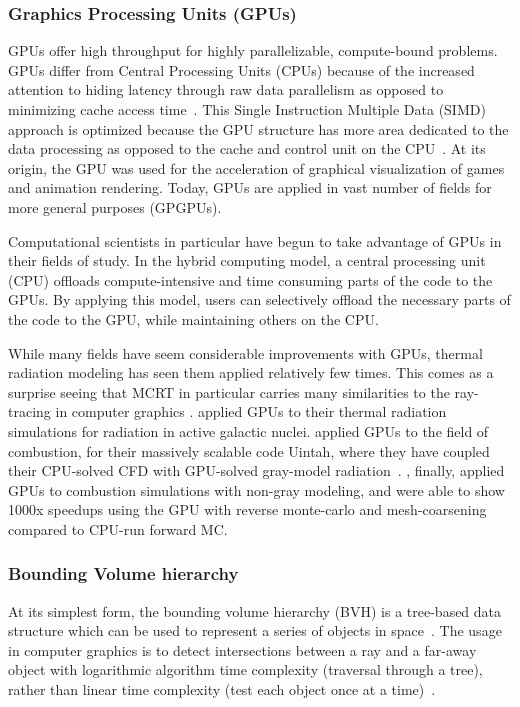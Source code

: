 \subsubsection{Graphics Processing Units (GPUs)}
GPUs offer high throughput for highly parallelizable, compute-bound problems.
GPUs differ from Central Processing Units (CPUs) because of the increased attention to hiding latency through raw data parallelism as opposed to minimizing cache access time~\cite{Caulfield2009WhatsGPU}. 
This Single Instruction Multiple Data (SIMD) approach is optimized because the GPU structure has more area dedicated to the data processing as opposed to the cache and control unit on the CPU~\cite{Gupta2020CUDAComputing}.
At its origin, the GPU was used for the acceleration of graphical visualization of games and animation rendering. Today, GPUs are applied in vast number of fields for more general purposes (GPGPUs).

Computational scientists in particular have begun to take advantage of GPUs in their fields of study. In the hybrid computing model, a central processing unit (CPU) offloads compute-intensive and time consuming parts of the code to the GPUs.
By applying this model, users can selectively offload the necessary parts of the code to the GPU, while maintaining others on the CPU.

While many fields have seem considerable improvements with GPUs, thermal radiation modeling has seen them applied relatively few times. This comes as a surprise seeing that MCRT in particular carries many similarities to the ray-tracing in computer graphics \cite{Zeeb2001AnGeometries}.
\citet{Heymann2012GPU-basedAGN} applied GPUs to their thermal radiation simulations for radiation in active galactic nuclei.
\citet{Humphrey2012RadiationSystem} applied GPUs to the field of combustion, for their massively scalable code Uintah, where they have coupled their CPU-solved CFD with GPU-solved gray-model radiation~\cite{Humphrey2015ATracingb,Humphrey2016RadiativeRefinement,Holmen2017ImprovingTasks,Peterson2018DemonstratingComputations}. 
\citet{Silvestri2019ASimulation}, finally, applied GPUs to combustion simulations with non-gray modeling, and were able to show 1000x speedups using the GPU with reverse monte-carlo and mesh-coarsening compared to CPU-run forward MC.

\subsubsection{Bounding Volume hierarchy}
At its simplest form, the bounding volume hierarchy (BVH) is a tree-based data structure which can be used to represent a series of objects in space~\cite{Shirley2020RayWeek,Meister2021ATracing}. The usage in computer graphics is to detect intersections between a ray and a far-away object with logarithmic algorithm time complexity (traversal through a tree), rather than linear time complexity (test each object once at a time)~\cite{Zeeb2001AnGeometries}.

